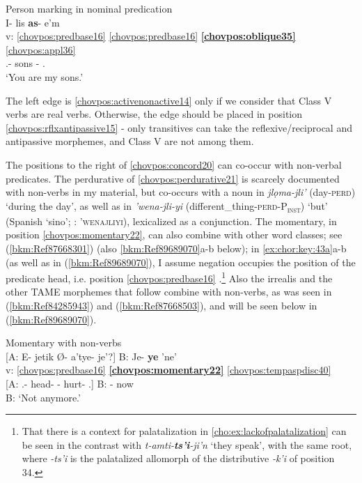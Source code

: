 \documentclass[output=paper]{langscibook}
\begin{document}
\ea\label{bkm:Ref89694538}Person marking in nominal predication \\
    \glll {} I- lis     \textbf{as}{}- e'm \\
    v: \ref{chovpos:predbase16} \ref{chovpos:predbase16} \textbf{\ref{chovpos:oblique35}} \ref{chovpos:appl36} \\
    {} \First\Sg.\Poss{}- sons  \Second\Pl{}- \Ap.\Loc{} \\
\glt `You are my sons.'
\z 


The left edge is \ref{chovpos:activenonactive14} only if we consider that Class V verbs are real verbs. Otherwise, the edge should be placed in position \ref{chovpos:rflxantipassive15} - only transitives can take the reflexive/reciprocal and antipassive morphemes, and Class V are not among them.

The positions to the right of \ref{chovpos:concord20} can co-occur with non-verbal predicates. The perdurative of \ref{chovpos:perdurative21} is scarcely documented with non-verbs in my material, but co-occurs with a noun in \textit{jlọma-jli'} (day-\textsc{perd}) `during the day', as well as in \textit{'wena-jli-yi} (different\_thing-\textsc{perd-P}\textsc{\textsubscript{inst}}) `but' (Spanish `sino'; \citealt{DraysonGomez2000}: \textsc{'wenajliyi}), lexicalized as a conjunction. The momentary, in position \ref{chovpos:momentary22}, can also combine with other word classes; see (\ref{bkm:Ref87668301}) (also \ref{bkm:Ref89689070}a-b below); in \ref{ex:chor:key:43a}a-b (as well as in (\ref{bkm:Ref89689070}), I assume negation occupies the position of the predicate head, i.e. position \ref{chovpos:predbase16} .\footnote{That there is a context for palatalization in \ref{cho:ex:lackofpalatalization} can be seen in the contrast with \textit{t-amti-}\textbf{\textit{ts'i}}\textit{{}-ji'n} `they speak', with the same root, where \textit{-ts'i} is the palatalized allomorph of the distributive \textit{-k'i} of position 34.} Also the irrealis and the other TAME morphemes that follow combine with non-verbs, as was seen in (\ref{bkm:Ref84285943}) and (\ref{bkm:Ref87668503}), and will be seen below in (\ref{bkm:Ref89689070}). 

\ea\label{bkm:Ref87668301} Momentary with non-verbs \\ 
    \ea\label{ex:chor:key:43a}  {
    \glll {} [A: E{}- jetik Ø{}- a'tye{}- je'?] B: Je- \textbf{ye} 'ne'\\ 
        v: \ref{chovpos:predbase16} \textbf{\ref{chovpos:momentary22}} \ref{chovpos:tempaspdisc40}\\ 
        {} [A: \Second.\Poss{}- head-  \Third{}- hurt- \Ap.\Loc{}] B: \Neg{}- \textbf{\Mom{}} now \\
     B: `Not anymore.'
    }
    \z 
\z 
\end{document}
